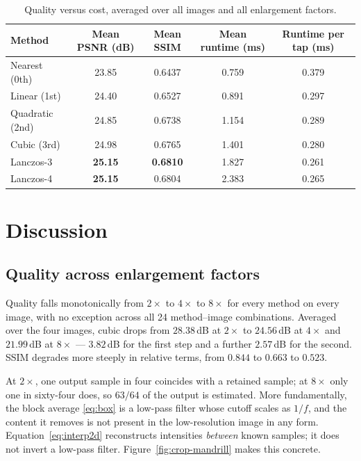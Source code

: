 \documentclass[11pt,a4paper]{article}
\begin{document}
\begin{table}[H]
\centering
\caption{Quality versus cost, averaged over all images and all enlargement factors.}
\label{tab:summary}
\begin{tabular}{lcccc}
\toprule
Method & Mean PSNR (dB) & Mean SSIM & Mean runtime (ms) & Runtime per tap (ms) \\
\midrule
Nearest (0th)   & 23.85 & 0.6437 & 0.759 & 0.379 \\
Linear (1st)    & 24.40 & 0.6527 & 0.891 & 0.297 \\
Quadratic (2nd) & 24.85 & 0.6738 & 1.154 & 0.289 \\
Cubic (3rd)     & 24.98 & 0.6765 & 1.401 & 0.280 \\
Lanczos-3       & \textbf{25.15} & \textbf{0.6810} & 1.827 & 0.261 \\
Lanczos-4       & \textbf{25.15} & 0.6804 & 2.383 & 0.265 \\
\bottomrule
\end{tabular}
\end{table}

\section{Discussion}

\subsection{Quality across enlargement factors}

Quality falls monotonically from $2\times$ to $4\times$ to $8\times$ for every method on every
image, with no exception across all 24 method--image combinations. Averaged over the four
images, cubic drops from $28.38$\,dB at $2\times$ to $24.56$\,dB at $4\times$ and $21.99$\,dB
at $8\times$ --- $3.82$\,dB for the first step and a further $2.57$\,dB for the second. SSIM
degrades more steeply in relative terms, from $0.844$ to $0.663$ to $0.523$.

At $2\times$, one output sample in four coincides with a retained sample; at $8\times$ only
one in sixty-four does, so $63/64$ of the output is estimated. More fundamentally, the block
average \eqref{eq:box} is a low-pass filter whose cutoff scales as $1/f$, and the content it
removes is not present in the low-resolution image in any form. Equation~\eqref{eq:interp2d}
reconstructs intensities \emph{between} known samples; it does not invert a low-pass filter.
Figure~\ref{fig:crop-mandrill} makes this concrete.
\end{document}
